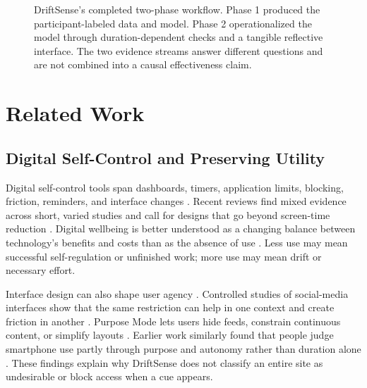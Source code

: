 \documentclass[12pt,a4paper]{article}
\newcommand{\citep}[1]{\parencite{#1}}
\begin{document}
\begin{figure}[htbp]
{
}
\caption{DriftSense's completed two-phase workflow. Phase 1 produced the participant-labeled data and model. Phase 2 operationalized the model through duration-dependent checks and a tangible reflective interface. The two evidence streams answer different questions and are not combined into a causal effectiveness claim.}
\label{fig:overview}
\end{figure}

\section{Related Work}

\subsection{Digital Self-Control and Preserving Utility}

Digital self-control tools span dashboards, timers, application limits, blocking, friction, reminders, and interface changes \citep{lyngs2019selfcontrol,roffarello2023digital}. Recent reviews find mixed evidence across short, varied studies and call for designs that go beyond screen-time reduction \citep{biedermann2021digital,plackett2023socialmedia,almoallim2022functionalities,almansoori2023designing}. Digital wellbeing is better understood as a changing balance between technology's benefits and costs than as the absence of use \citep{vandenabeele2020dynamic}. Less use may mean successful self-regulation or unfinished work; more use may mean drift or necessary effort.

Interface design can also shape user agency \citep{monge2023acdp,cecchinato2019agenda}. Controlled studies of social-media interfaces show that the same restriction can help in one context and create friction in another \citep{lyngs2020facebook}. Purpose Mode lets users hide feeds, constrain continuous content, or simplify layouts \citep{lee2025purpose}. Earlier work similarly found that people judge smartphone use partly through purpose and autonomy rather than duration alone \citep{lukoff2018meaningful}. These findings explain why DriftSense does not classify an entire site as undesirable or block access when a cue appears.
\end{document}
